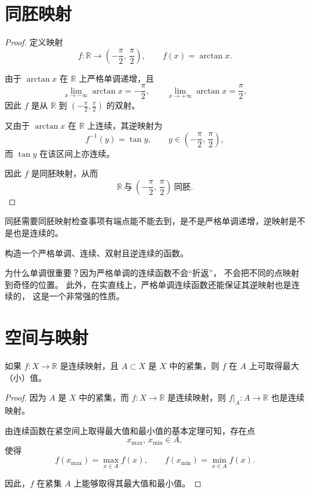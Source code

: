 \section{同胚映射}
\begin{proof}
定义映射
\[
f:\mathbb{R}\to\left(-\frac{\pi}{2},\,\frac{\pi}{2}\right),\qquad
f(x)=\arctan x.
\]

由于 $\arctan x$ 在 $\mathbb{R}$ 上严格单调递增，且
\[
\lim_{x\to-\infty}\arctan x=-\frac{\pi}{2},\qquad
\lim_{x\to+\infty}\arctan x=\frac{\pi}{2},
\]
因此 $f$ 是从 $\mathbb{R}$ 到 $\left(-\frac{\pi}{2},\frac{\pi}{2}\right)$ 的双射。

又由于 $\arctan x$ 在 $\mathbb{R}$ 上连续，其逆映射为
\[
f^{-1}(y)=\tan y,\qquad y\in\left(-\frac{\pi}{2},\,\frac{\pi}{2}\right),
\]
而 $\tan y$ 在该区间上亦连续。

因此 $f$ 是同胚映射，从而
\[
\mathbb{R}\ \text{与}\ \left(-\frac{\pi}{2},\,\frac{\pi}{2}\right)\ \text{同胚}.
\]
\end{proof}
\begin{dxtips}
    同胚需要同胚映射检查事项有端点能不能去到，是不是严格单调递增，逆映射是不是也是连续的。
\end{dxtips}
\begin{dxtips}
构造一个严格单调、连续、双射且逆连续的函数。

为什么单调很重要？因为严格单调的连续函数不会“折返”，
不会把不同的点映射到奇怪的位置。
此外，在实直线上，严格单调连续函数还能保证其逆映射也是连续的，
这是一个非常强的性质。
\end{dxtips}
\section{空间与映射}
\begin{theorem}
如果 $f:X\to \mathbb{R}$ 是连续映射，且 $A\subset X$ 是 $X$ 中的紧集，则 $f$ 在 $A$ 上可取得最大（小）值。
\end{theorem}
\begin{proof}
因为 $A$ 是 $X$ 中的紧集，而 $f:X\to\mathbb{R}$ 是连续映射，则 $f|_{A}:A\to\mathbb{R}$ 
也是连续映射。

由连续函数在紧空间上取得最大值和最小值的基本定理可知，存在点
\[
x_{\max},\,x_{\min}\in A,
\]
使得
\[
f(x_{\max})=\max_{x\in A} f(x),\qquad 
f(x_{\min})=\min_{x\in A} f(x).
\]

因此，$f$ 在紧集 $A$ 上能够取得其最大值和最小值。
\end{proof}
